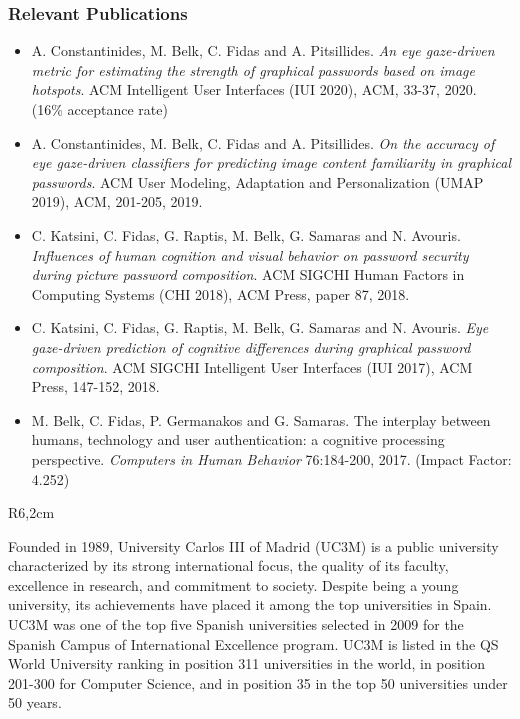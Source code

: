 \documentclass[a4paper,11pt]{article}
\begin{document}
\subsubsection*{Relevant Publications}

\begin{itemize}
\item A. Constantinides, M. Belk, C. Fidas and A. Pitsillides. \emph{An eye gaze-driven metric for estimating the strength of graphical passwords based on image hotspots}. ACM Intelligent User Interfaces (IUI 2020), ACM, 33-37, 2020. (16\% acceptance rate)
\item A. Constantinides, M. Belk, C. Fidas and A. Pitsillides. \emph{On the accuracy of eye gaze-driven classifiers for predicting image content familiarity in graphical passwords}. ACM User Modeling, Adaptation and Personalization (UMAP 2019), ACM, 201-205, 2019.
\item C. Katsini, C. Fidas, G. Raptis, M. Belk, G. Samaras and N. Avouris. 
\emph{Influences of human cognition and visual behavior on password security during picture password composition}. ACM SIGCHI Human Factors in Computing Systems (CHI 2018), ACM Press, paper 87, 2018.
\item C. Katsini, C. Fidas, G. Raptis, M. Belk, G. Samaras and N. Avouris. \emph{Eye gaze-driven prediction of cognitive differences during graphical password composition}. ACM SIGCHI Intelligent User Interfaces (IUI 2017), ACM Press, 147-152, 2018.
\item M. Belk, C. Fidas, P. Germanakos and G. Samaras. The interplay between humans, technology and user authentication: a cognitive processing perspective. \emph{Computers in Human Behavior} 76:184-200, 2017.
(Impact Factor: 4.252)


\end{itemize}


\begin{wrapfigure}{R}{6,2cm}
\vspace{-3cm}
\hfill {}
\vspace{-1cm}
\end{wrapfigure}
\vspace{10pt}

Founded in 1989, University Carlos III of Madrid (UC3M) is a public university characterized by its strong
international focus, the quality of its faculty, excellence in research, and commitment to society. Despite being
a young university, its achievements have placed it among the top universities in Spain. UC3M was one of
the top five Spanish universities selected in 2009 for the Spanish Campus of International Excellence program.
UC3M
is listed in the QS World University ranking in position 311 universities in the world, in position 201-300 for
Computer Science, and in position 35 in the top 50 universities under 50 years. 
\end{document}
